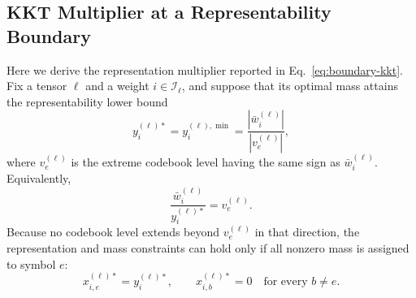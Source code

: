 \documentclass{article}
\begin{document}
\subsection{KKT Multiplier at a Representability Boundary}
\label{app:boundary-kkt-derivation}

Here we derive the representation multiplier reported in
Eq.~\eqref{eq:boundary-kkt}. Fix a tensor $\ell$ and a weight
$i\in\mathcal I_\ell$, and suppose that its optimal mass attains the
representability lower bound
\[
  y_i^{(\ell)*}
  =y_i^{(\ell),\min}
  =\frac{|\bar w_i^{(\ell)}|}{|v_e^{(\ell)}|},
\]
where $v_e^{(\ell)}$ is the extreme codebook level having the same sign as
$\bar w_i^{(\ell)}$. Equivalently,
\[
  \frac{\bar w_i^{(\ell)}}{y_i^{(\ell)*}}
  =v_e^{(\ell)}.
\]
Because no codebook level extends beyond $v_e^{(\ell)}$ in that direction, the
representation and mass constraints can hold only if all nonzero mass is
assigned to symbol $e$:
\[
  x_{i,e}^{(\ell)*}=y_i^{(\ell)*},
  \qquad
  x_{i,b}^{(\ell)*}=0
  \quad\text{for every }b\neq e.
\]
\end{document}
